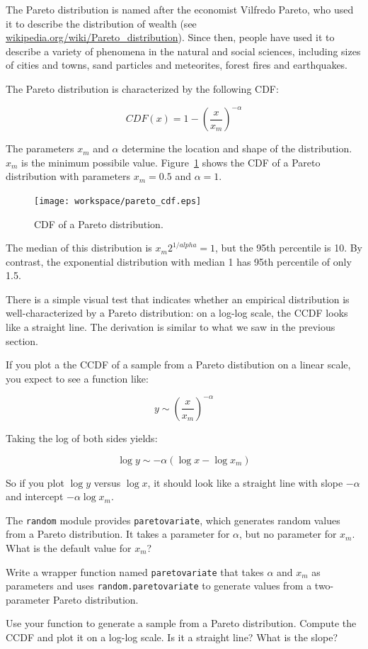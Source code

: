 \documentclass[12pt]{book}
\begin{document}
The Pareto distribution is named after the economist Vilfredo Pareto,
who used it to describe the distribution of wealth (see
\url{wikipedia.org/wiki/Pareto_distribution}).  Since then, people
have used it to describe a variety of phenomena in the natural and
social sciences, including sizes of cities and towns, sand particles
and meteorites, forest fires and earthquakes.

The Pareto distribution is characterized by the following CDF:

\[ CDF(x) = 1- \left( \frac{x}{x_m} \right) ^{-\alpha} \]

The parameters $x_m$ and $\alpha$ determine the location and shape of
the distribution.  $x_m$ is the minimum possibile value.
Figure~\ref{pareto_cdf} shows the CDF of a Pareto distribution with
parameters $x_m = 0.5$ and $\alpha = 1$.

\begin{figure}
\centerline{\texttt{[image: workspace/pareto\_cdf.eps]}}
\caption{CDF of a Pareto distribution.}
\label{pareto_cdf}
\end{figure}

The median of this distribution is $x_m 2^{1/alpha} = 1$, but the
95th percentile is 10.  By contrast, the exponential distribution
with median 1 has 95th percentile of only 1.5.

There is a simple visual test that indicates whether an empirical
distribution is well-characterized by a Pareto distribution: on a
log-log scale, the CCDF looks like a straight line.  The derivation is
similar to what we saw in the previous section.

If you plot a the CCDF of a sample from a Pareto distibution on a
linear scale, you expect to see a function like:

\[ y \sim \left( \frac{x}{x_m} \right) ^{-\alpha} \]

Taking the log of both sides yields:

\[ \log y \sim -\alpha (\log x - \log x_m ) \]

So if you plot $\log y$ versus $\log x$, it should look like a
straight line with slope $-\alpha$ and intercept $-\alpha \log x_m$.

\begin{ex}

The {\tt random} module provides {\tt paretovariate},
which generates random values from a Pareto distribution.  It takes
a parameter for $\alpha$, but no parameter for $x_m$.  What is
the default value for $x_m$?

Write a wrapper function named {\tt paretovariate} that takes $\alpha$
and $x_m$ as parameters and uses {\tt random.paretovariate} to
generate values from a two-parameter Pareto distribution.

Use your function to generate a sample from a Pareto distribution.
Compute the CCDF and plot it on a log-log scale.  Is it a straight
line?  What is the slope?

\end{ex}
\end{document}
